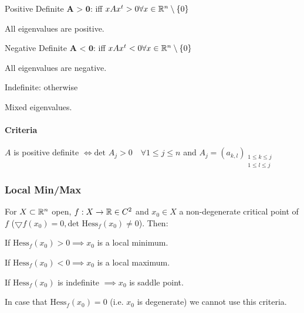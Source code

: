 \begin{compactdesc}
    \item[Positive Definite $\textbf{A > 0}$:] iff $xAx^t > 0 \forall x \in \mathbb{R}^n \setminus \{0\}$
        \begin{compactitem}
            \item All eigenvalues are positive.
        \end{compactitem}
    \item[Negative Definite $\textbf{A < 0}$:] iff $xAx^t < 0 \forall x \in \mathbb{R}^n \setminus \{0\}$
        \begin{compactitem}
            \item All eigenvalues are negative.
        \end{compactitem}
    \item[Indefinite:] otherwise
        \begin{compactitem}
            \item Mixed eigenvalues.
        \end{compactitem}
\end{compactdesc}

\paragraph{Criteria}
$A$ is positive definite $\iff \text{det }A_j > 0 \quad \forall 1 \le j \le n$ and $A_j = (a_{k,l})_{\substack{1 \le k \le j\\ 1 \le l \le j}}$

\subsubsection{Local Min/Max}
For $X \subset \mathbb{R}^n$ open, $f: X \to \mathbb{R} \in C^2$ and $x_0 \in X$ a non-degenerate critical point of $f$ ($\bigtriangledown f(x_0) = 0, \text{det Hess}_f (x_0) \neq 0$). Then:
\begin{compactitem}
    \item If $\text{Hess}_f (x_0) > 0 \implies x_0$ is a local minimum.
    \item If $\text{Hess}_f (x_0) < 0 \implies x_0$ is a local maximum.
    \item If $\text{Hess}_f (x_0)$ is indefinite $\implies x_0$ is saddle point.
\end{compactitem}

In case that $\text{Hess}_f (x_0) = 0$ (i.e. $x_0$ is degenerate) we cannot use this criteria.

